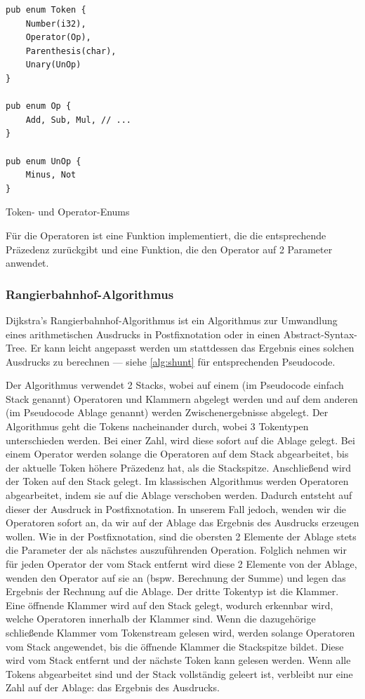 \begin{listing}[th]
\begin{verbatim}
pub enum Token {
    Number(i32),
    Operator(Op),
    Parenthesis(char),
    Unary(UnOp)
}

pub enum Op {
    Add, Sub, Mul, // ...
}

pub enum UnOp {
    Minus, Not
}
\end{verbatim}
\label{lst:token-enum}
\caption{Token- und Operator-Enums}
\end{listing}

Für die Operatoren ist eine Funktion implementiert, die die entsprechende Präzedenz zurückgibt und eine Funktion, die den Operator auf 2 Parameter anwendet.

\subsubsection{Rangierbahnhof-Algorithmus}

Dijkstra's Rangierbahnhof-Algorithmus ist ein Algorithmus zur Umwandlung eines arithmetischen Ausdrucks in Postfixnotation oder in einen Abstract-Syntax-Tree. Er kann leicht angepasst werden um stattdessen das Ergebnis eines solchen Ausdrucks zu berechnen --- siehe \cref{alg:shunt} für entsprechenden Pseudocode.

Der Algorithmus verwendet 2 Stacks, wobei auf einem (im Pseudocode einfach Stack genannt) Operatoren und Klammern abgelegt werden und auf dem anderen (im Pseudocode Ablage genannt) werden Zwischenergebnisse abgelegt.
Der Algorithmus geht die Tokens nacheinander durch, wobei 3 Tokentypen unterschieden werden. Bei einer Zahl, wird diese sofort auf die Ablage gelegt. Bei einem Operator werden solange die Operatoren auf dem Stack abgearbeitet, bis der aktuelle Token höhere Präzedenz hat, als die Stackspitze. Anschließend wird der Token auf den Stack gelegt.
Im klassischen Algorithmus werden Operatoren abgearbeitet, indem sie auf die Ablage verschoben werden. Dadurch entsteht auf dieser der Ausdruck in Postfixnotation. In unserem Fall jedoch, wenden wir die Operatoren sofort an, da wir auf der Ablage das Ergebnis des Ausdrucks erzeugen wollen. Wie in der Postfixnotation, sind die obersten 2 Elemente der Ablage stets die Parameter der als nächstes auszuführenden Operation. Folglich nehmen wir für jeden Operator der vom Stack entfernt wird diese 2 Elemente von der Ablage, wenden den Operator auf sie an (bspw. Berechnung der Summe) und legen das Ergebnis der Rechnung auf die Ablage. Der dritte Tokentyp ist die Klammer. Eine öffnende Klammer wird auf den Stack gelegt, wodurch erkennbar wird, welche Operatoren innerhalb der Klammer sind. Wenn die dazugehörige schließende Klammer vom Tokenstream gelesen wird, werden solange Operatoren vom Stack angewendet, bis die öffnende Klammer die Stackspitze bildet. Diese wird vom Stack entfernt und der nächste Token kann gelesen werden.
Wenn alle Tokens abgearbeitet sind und der Stack vollständig geleert ist, verbleibt nur eine Zahl auf der Ablage: das Ergebnis des Ausdrucks.

